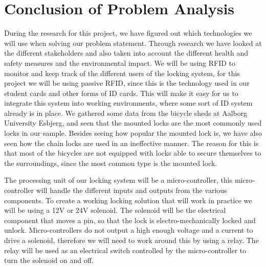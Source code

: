 \section{Conclusion of Problem Analysis}
During the research for this project, we have figured out which technologies we will use when solving our problem statement. Through research we have looked at the different stakeholders and also taken into account the different health and safety measures and the environmental impact.
We will be using RFID to monitor and keep track of the different users of the locking system, for this project we will be using passive RFID, since this is the technology used in our student cards and other forms of ID cards. This will make it easy for us to integrate this system into working environments, where some sort of ID system already is in place. 
We gathered some data from the bicycle sheds at Aalborg University Esbjerg, and seen that the mounted locks are the most commonly used locks in our sample. Besides seeing how popular the mounted lock is, we have also seen how the chain locks are used in an ineffective manner. The reason for this is that most of the bicycles are not equipped with locks able to secure themselves to the surroundings, since the most common type is the mounted lock.

The processing unit of our locking system will be a micro-controller, this micro-controller will handle the different inputs and outputs from the various components.
To create a working locking solution that will work in practice we will be using a 12V or 24V solenoid. The solenoid will be the electrical component that moves a pin, so that the lock is electro-mechanically locked and unlock. 
Micro-controllers do not output a high enough voltage and a current to drive a solenoid, therefore we will need to work around this by using a relay. The relay will be used as an electrical switch controlled by the micro-controller to turn the solenoid on and off.
\clearpage
